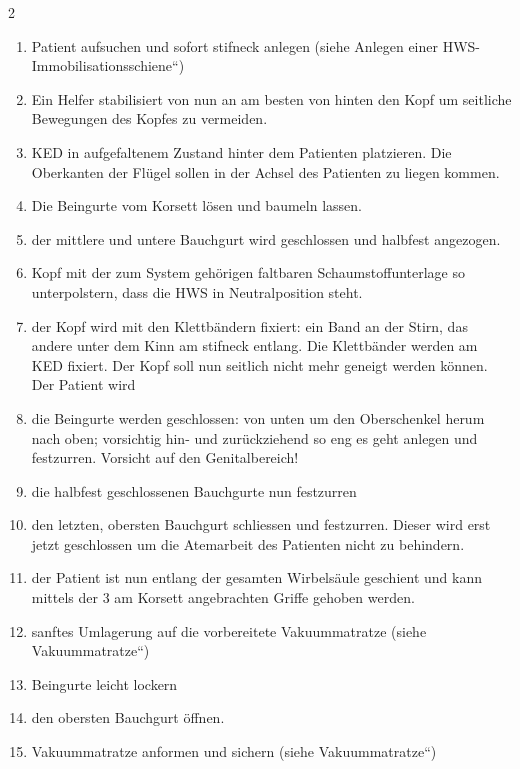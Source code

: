 \begin{multicols}{2}
\begin{enumerate}
    \item Patient aufsuchen und sofort stifneck anlegen
    (siehe {\quotedblbase}Anlegen einer
    HWS-Immobilisationsschiene{\textquotedblleft})
    \item Ein Helfer stabilisiert von nun an am besten von hinten den Kopf um seitliche Bewegungen des Kopfes
    zu vermeiden.
    \item KED  in aufgefaltenem Zustand
    hinter dem Patienten platzieren. Die Oberkanten der
    Flügel sollen in der Achsel des Patienten zu liegen
    kommen.
    \item Die Beingurte vom Korsett lösen und baumeln
    lassen.
    \item der mittlere und untere Bauchgurt wird
    geschlossen und halbfest angezogen.
    \item Kopf mit der zum System gehörigen faltbaren
    Schaumstoffunterlage so unterpolstern, dass die HWS in
    Neutralposition steht.
    \item der Kopf wird mit den Klettbändern fixiert: ein
    Band an der Stirn, das andere unter dem Kinn am
    stifneck entlang. Die Klettbänder werden am KED
    fixiert. Der Kopf soll nun seitlich nicht mehr geneigt
    werden können. Der Patient wird 
    \item die Beingurte werden geschlossen: von unten um
    den Oberschenkel herum nach oben; vorsichtig hin- und
    zurückziehend so eng es geht anlegen und festzurren.
    Vorsicht auf den Genitalbereich!
    \item die halbfest geschlossenen Bauchgurte nun
    festzurren
    \item den letzten, obersten Bauchgurt schliessen und
    festzurren. Dieser wird erst jetzt geschlossen um die
    Atemarbeit des Patienten nicht zu behindern.
    \item der Patient ist nun entlang der gesamten
    Wirbelsäule geschient und kann mittels der 3 am Korsett
    angebrachten Griffe gehoben werden.
    \item sanftes Umlagerung auf die vorbereitete
    Vakuummatratze (siehe {\quotedblbase}Vakuummatratze{\textquotedblleft})
    \item Beingurte leicht lockern
    \item den obersten Bauchgurt öffnen.
    \item Vakuummatratze anformen und sichern  (siehe
    {\quotedblbase}Vakuummatratze{\textquotedblleft})   
       
\end{enumerate}
\end{multicols}



